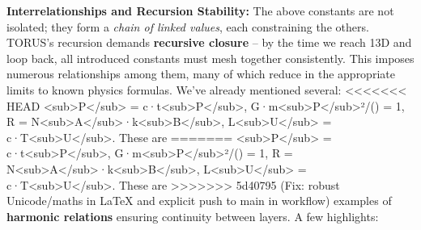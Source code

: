 \documentclass[]{article}
\begin{document}
{\textbf{Interrelationships and Recursion Stability:} The above constants
are not isolated; they form a \emph{chain of linked values}, each
constraining the others. TORUS's recursion demands \textbf{recursive
closure} -- by the time we reach 13D and loop back, all introduced
constants must mesh together consistently. This imposes numerous
relationships among them, many of which reduce in the appropriate limits
to known physics formulas. We've already mentioned several:
<<<<<<< HEAD
\ell\textless sub\textgreater P\textless/sub\textgreater{} =
c·t\textless sub\textgreater P\textless/sub\textgreater,
G·m\textless sub\textgreater P\textless/sub\textgreater²/(\hbarc) = 1, R =
N\textless sub\textgreater A\textless/sub\textgreater·k\textless sub\textgreater B\textless/sub\textgreater,
L\textless sub\textgreater U\textless/sub\textgreater{} =
c·T\textless sub\textgreater U\textless/sub\textgreater. These are
=======
\ell\textless{}sub\textgreater{}P\textless{}/sub\textgreater{} =
c·t\textless{}sub\textgreater{}P\textless{}/sub\textgreater{},
G·m\textless{}sub\textgreater{}P\textless{}/sub\textgreater{}²/(\hbarc) = 1,
R =
N\textless{}sub\textgreater{}A\textless{}/sub\textgreater{}·k\textless{}sub\textgreater{}B\textless{}/sub\textgreater{},
L\textless{}sub\textgreater{}U\textless{}/sub\textgreater{} =
c·T\textless{}sub\textgreater{}U\textless{}/sub\textgreater{}. These are
>>>>>>> 5d40795 (Fix: robust Unicode/maths in LaTeX and explicit push to main in workflow)
examples of \textbf{harmonic relations} ensuring continuity between
layers. A few highlights:

}
\end{document}
